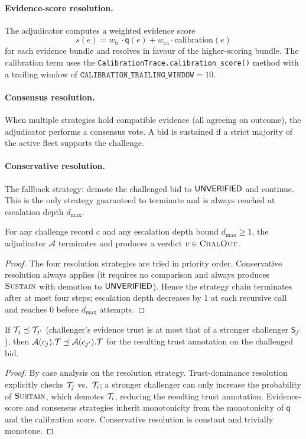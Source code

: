 \documentclass[11pt]{article}
\providecommand{\Strat}{\mathsf{S}}               %
\providecommand{\Adj}{\mathcal{A}}                %
\providecommand{\tqual}{\mathsf{q}}               %
\providecommand{\ChalOut}{\textsc{ChalOut}}       %
\providecommand{\SUSTAIN}{\textsc{Sustain}}
\begin{document}
\paragraph{Evidence-score resolution.}
The adjudicator computes a weighted evidence score
\[
  s(e) = w_{\text{tr}} \cdot \tqual(e) + w_{\text{ca}} \cdot \text{calibration}(e)
\]
for each evidence bundle and resolves in favour of the higher-scoring bundle.
The calibration term uses the \texttt{CalibrationTrace.calibration\_score()}
method with a trailing window of $\texttt{CALIBRATION\_TRAILING\_WINDOW} = 10$.

\paragraph{Consensus resolution.}
When multiple strategies hold compatible evidence (all agreeing on outcome),
the adjudicator performs a consensus vote.  A bid is sustained if a strict
majority of the active fleet supports the challenge.

\paragraph{Conservative resolution.}
The fallback strategy: demote the challenged bid to $\mathsf{UNVERIFIED}$ and continue.
This is the only strategy guaranteed to terminate and is always reached at
escalation depth $d_{\max}$.

\begin{proposition}\label{prop:termination}
For any challenge record $c$ and any escalation depth bound $d_{\max} \geq 1$,
the adjudicator $\Adj$ terminates and produces a verdict $v \in \ChalOut{}$.
\end{proposition}
\begin{proof}
The four resolution strategies are tried in priority order.  Conservative
resolution always applies (it requires no comparison and always produces
$\SUSTAIN$ with demotion to $\mathsf{UNVERIFIED}$).  Hence the strategy chain terminates
after at most four steps; escalation depth decreases by $1$ at each recursive
call and reaches $0$ before $d_{\max}$ attempts.
\end{proof}

\begin{proposition}\label{prop:monoadj}
If $\mathcal{T}_j \preceq \mathcal{T}_{j'}$ (challenger's evidence trust is at most that
of a stronger challenger $\Strat_{j'}$), then
$\Adj(c_j).{\trust} \tleq \Adj(c_{j'}).{\trust}$ for the resulting trust
annotation on the challenged bid.
\end{proposition}
\begin{proof}
By case analysis on the resolution strategy.  Trust-dominance resolution
explicitly checks $\mathcal{T}_j$ vs.\ $\mathcal{T}_i$; a stronger challenger can only
increase the probability of $\SUSTAIN{}$, which demotes $\mathcal{T}_i$, reducing
the resulting trust annotation.  Evidence-score and consensus strategies
inherit monotonicity from the monotonicity of $\tqual$ and the calibration
score.  Conservative resolution is constant and trivially monotone.
\end{proof}
\end{document}
